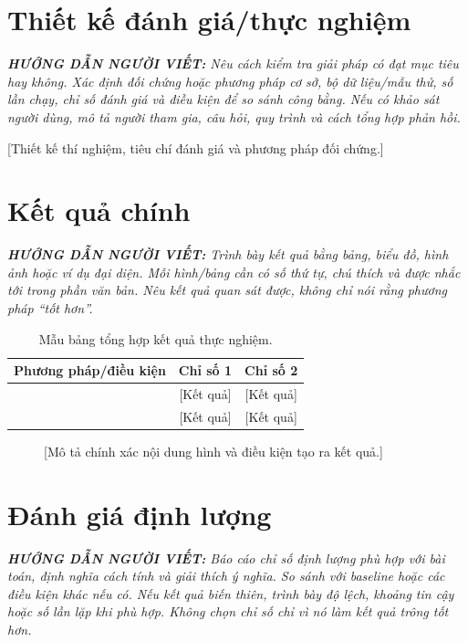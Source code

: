 \documentclass[12pt,a4paper]{report}
\newcommand{\huongdan}[1]{%
  \par\smallskip\noindent
  \textit{\textbf{HƯỚNG DẪN NGƯỜI VIẾT:} #1}%
  \par\smallskip}
\begin{document}
\section{Thiết kế đánh giá/thực nghiệm}

\huongdan{Nêu cách kiểm tra giải pháp có đạt mục tiêu hay không. Xác định
đối chứng hoặc phương pháp cơ sở, bộ dữ liệu/mẫu thử, số lần chạy, chỉ số
đánh giá và điều kiện để so sánh công bằng. Nếu có khảo sát người dùng,
mô tả người tham gia, câu hỏi, quy trình và cách tổng hợp phản hồi.}

[Thiết kế thí nghiệm, tiêu chí đánh giá và phương pháp đối chứng.]

\section{Kết quả chính}

\huongdan{Trình bày kết quả bằng bảng, biểu đồ, hình ảnh hoặc ví dụ đại diện.
Mỗi hình/bảng cần có số thứ tự, chú thích và được nhắc tới trong phần văn bản.
Nêu kết quả quan sát được, không chỉ nói rằng phương pháp ``tốt hơn''.}

\begin{table}[H]
  \centering
  \caption{Mẫu bảng tổng hợp kết quả thực nghiệm.}
  \label{tab:results}
  \begin{tabularx}{\textwidth}{Xcc}
    \toprule
    \textbf{Phương pháp/điều kiện} & \textbf{Chỉ số 1} & \textbf{Chỉ số 2} \\
    \midrule
    [Phương pháp cơ sở] & [Kết quả] & [Kết quả] \\
    [Phương pháp đề xuất] & [Kết quả] & [Kết quả] \\
    \bottomrule
  \end{tabularx}
\end{table}

\begin{figure}[H]
  \centering
  \caption{[Mô tả chính xác nội dung hình và điều kiện tạo ra kết quả.]}
  \label{fig:result}
\end{figure}

\section{Đánh giá định lượng}

\huongdan{Báo cáo chỉ số định lượng phù hợp với bài toán, định nghĩa cách tính
và giải thích ý nghĩa. So sánh với baseline hoặc các điều kiện khác nếu có.
Nếu kết quả biến thiên, trình bày độ lệch, khoảng tin cậy hoặc số lần lặp khi
phù hợp. Không chọn chỉ số chỉ vì nó làm kết quả trông tốt hơn.}
\end{document}
